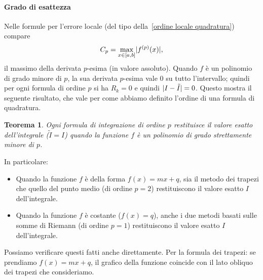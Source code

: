 \documentclass[a4paper]{report}
\DeclarePairedDelimiter{\abs}{\lvert}{\rvert}
\newtheorem{theorem}{Teorema}[chapter]
\theoremstyle{definiton}
\theoremstyle{remark}
\newcommand{\x}{\mathbf{x}}
\begin{document}
\paragraph{Grado di esattezza} Nelle formule per l'errore locale (del tipo della~\eqref{ordine locale quadratura}) compare
\[
    C_p = \max_{x\in [a,b]} \abs{f^{(p)}(x)},
\]
il massimo della derivata $p$-esima (in valore assoluto). Quando $f$ è un polinomio di grado minore di $p$, la sua derivata $p$-esima vale $0$ su tutto l'intervallo; quindi per ogni formula di ordine $p$ si ha $R_k=0$ e quindi $\abs{I-\tilde{I}}=0$. Questo mostra il seguente risultato, che vale per come abbiamo definito l'ordine di una formula di quadratura.
\begin{theorem}
    Ogni formula di integrazione di ordine $p$ restituisce il valore esatto dell'integrale ($\tilde{I}=I$) quando la funzione $f$ è un polinomio di grado strettamente minore di $p$.
\end{theorem}
In particolare:
\begin{itemize}
    \item Quando la funzione $f$ è della forma $f(x) = mx+q$, sia il metodo dei trapezi che quello del punto medio (di ordine $p=2$) restituiscono il valore esatto $I$ dell'integrale.
    \item Quando la funzione $f$ è costante ($f(x)=q$), anche i due metodi basati sulle somme di Riemann (di ordine $p=1$) restituiscono il valore esatto $I$ dell'integrale.
\end{itemize}
Possiamo verificare questi fatti anche direttamente. Per la formula dei trapezi: se prendiamo $f(x) = mx+q$, il grafico della funzione coincide con il lato obliquo dei trapezi che consideriamo.
\begin{center}
    \end{center}
\end{document}
